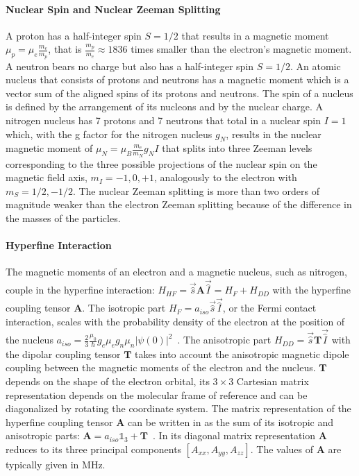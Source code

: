 \paragraph*{Nuclear Spin and Nuclear Zeeman Splitting}
A proton has a half-integer spin $S=1/2$ that results in a magnetic moment $\mu_p = \mu_e\frac{m_e}{m_p}$, that is $\frac{m_p}{m_e}\approx1836$ times smaller than the electron's magnetic moment. A neutron bears no charge but also has a half-integer spin $S=1/2$. An atomic nucleus that consists of protons and neutrons has a magnetic moment which is a vector sum of the aligned spins of its protons and neutrons. The spin of a nucleus is defined by the arrangement of its nucleons and by the nuclear charge. A nitrogen nucleus has 7 protons and 7 neutrons that total in a nuclear spin $I=1$ which, with the g factor for the nitrogen nucleus $g_N$, results in the nuclear magnetic moment of $\mu_N=\mu_B\frac{m_e}{m_N}g_NI$ that splits into three Zeeman levels corresponding to the three possible projections of the nuclear spin on the magnetic field axis, $m_I=-1,0,+1$, analogously to the electron with $m_S=1/2,-1/2$. The nuclear Zeeman splitting is more than two orders of magnitude weaker than the electron Zeeman splitting because of the difference in the masses of the particles.

\paragraph*{Hyperfine Interaction}
The magnetic moments of an electron and a magnetic nucleus, such as nitrogen, couple in the hyperfine interaction: $H_{HF}=\vec{\hat{s}}\textbf{A}\vec{\hat{I}}=H_F+H_{DD}$ with the hyperfine coupling tensor $\textbf{A}$. The isotropic part $H_F=a_{iso}\vec{\hat{s}}\vec{\hat{I}}$, or the Fermi contact interaction, scales with the probability density of the electron at the position of the nucleus $a_{iso}=\frac{2}{3}\frac{\mu_0}{\hbar}g_e\mu_eg_n\mu_n\vert\psi(0)\vert^2$~\cite{Schweiger2001_hfi}. The anisotropic part $H_{DD}=\vec{\hat{s}}\textbf{T}\vec{\hat{I}}$ with the dipolar coupling tensor $\textbf{T}$ takes into account the anisotropic magnetic dipole coupling between the magnetic moments of the electron and the nucleus. $\textbf{T}$ depends on the shape of the electron orbital, its $3\times3$ Cartesian matrix representation depends on the molecular frame of reference and can be diagonalized by rotating the coordinate system. The matrix representation of the hyperfine coupling tensor $\textbf{A}$ can be written in as the sum of its isotropic and anisotropic parts: $\textbf{A}=a_{iso}\mathds{1}_3 + \textbf{T}$~\cite{Weil_Bolton}. In its diagonal matrix representation $\textbf{A}$ reduces to its three principal components $[A_{xx}, A_{yy}, A_{zz}]$. The values of $\textbf{A}$ are typically given in MHz.

